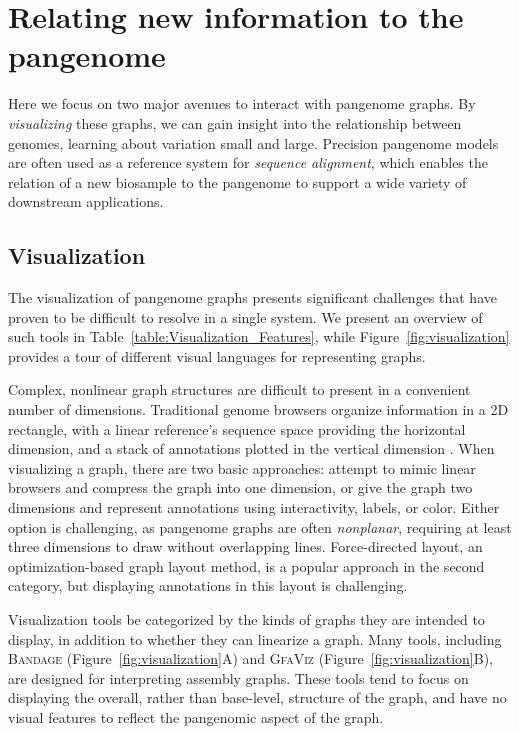 \section{Relating new information to the pangenome}

Here we focus on two major avenues to interact with pangenome graphs.
By \emph{visualizing} these graphs, we can gain insight into the relationship between genomes, learning about variation small and large.
Precision pangenome models are often used as a reference system for \emph{sequence alignment}, which enables the relation of a new biosample to the pangenome to support a wide variety of downstream applications.

\subsection{Visualization}

\label{sec:viz}


The visualization of pangenome graphs presents significant challenges that have proven to be difficult to resolve in a single system.
We present an overview of such tools in Table~\ref{table:Visualization_Features}, while Figure~\ref{fig:visualization} provides a tour of different visual languages for representing graphs.

Complex, nonlinear graph structures are difficult to present in a convenient number of dimensions.
Traditional genome browsers organize information in a 2D rectangle, with a linear reference's sequence space providing the horizontal dimension, and a stack of annotations plotted in the vertical dimension \cite{Haeussler_2018}.
When visualizing a graph, there are two basic approaches: attempt to mimic linear browsers and compress the graph into one dimension, or give the graph two dimensions and represent annotations using interactivity, labels, or color.
Either option is challenging, as pangenome graphs are often \emph{nonplanar}, requiring at least three dimensions to draw without overlapping lines.
Force-directed layout, an optimization-based graph layout method, is a popular approach in the second category, but displaying annotations in this layout is challenging.

Visualization tools be categorized by the kinds of graphs they are intended to display, in addition to whether they can linearize a graph.
Many tools, including \textsc{Bandage} \citep{Wick_2015} (Figure~\ref{fig:visualization}A) and \textsc{GfaViz} \cite{Gonnella_2018} (Figure~\ref{fig:visualization}B), are designed for interpreting assembly graphs. 
These tools tend to focus on displaying the overall, rather than base-level, structure of the graph, and have no visual features to reflect the pangenomic aspect of the graph.

